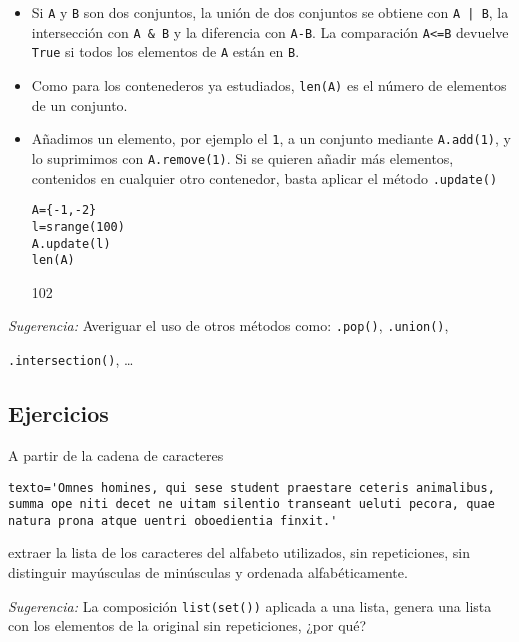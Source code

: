 \begin{itemize}
\item Si \lstinline|A| y \lstinline|B| son dos conjuntos, la unión de dos
conjuntos se
obtiene con \lstinline:A | B:, la intersección
con \lstinline|A & B| y la diferencia con \lstinline|A-B|.
La comparación \lstinline|A<=B| devuelve
\lstinline|True| si todos los elementos de \lstinline|A| están en \lstinline|B|.

\item  Como para los contenederos ya estudiados, \lstinline|len(A)| es el número
de
elementos de un conjunto.

\item  Añadimos un elemento, por ejemplo el \lstinline|1|, a un conjunto
mediante
\lstinline|A.add(1)|, y lo suprimimos con \lstinline|A.remove(1)|.
Si se quieren añadir más elementos, contenidos en cualquier otro contenedor,
basta
aplicar el método \lstinline|.update()|
\begin{lstlisting}
A={-1,-2}
l=srange(100)
A.update(l)
len(A)
\end{lstlisting}
\begin{Output}
	102
\end{Output}
                         
\end{itemize}
  
\noindent\emph{Sugerencia:} Averiguar el uso de otros métodos como:
\lstinline|.pop()|,
\lstinline|.union()|, 

\lstinline|.intersection()|, \dots


\subsection{Ejercicios}

\begin{ejer}
A partir de la cadena de caracteres
\begin{lstlisting}
texto='Omnes homines, qui sese student praestare ceteris animalibus, 
summa ope niti decet ne uitam silentio transeant ueluti pecora, quae 
natura prona atque uentri oboedientia finxit.'
\end{lstlisting}
extraer la lista de los caracteres del alfabeto utilizados, sin repeticiones,
sin
distinguir mayúsculas de minúsculas y ordenada alfabéticamente.

\noindent\emph{Sugerencia:} La composición \lstinline|list(set())| aplicada a
una lista,
genera una lista con los elementos de la original sin repeticiones, ¿por qué?

\end{ejer}

